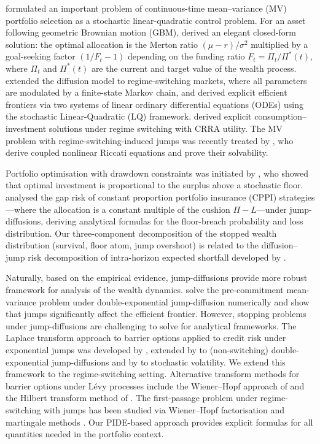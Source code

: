 \documentclass[11pt,a4paper]{article}
\numberwithin{equation}{section}
\begin{document}
\citet{ZhouLi2000} formulated an important problem of continuous-time mean--variance (MV) portfolio selection as a stochastic linear-quadratic control problem. For an asset following geometric Brownian motion (GBM), \citet{Lipton2001} derived an elegant closed-form solution: the optimal allocation is the Merton ratio $(\mu - r)/\sigma^2$ multiplied by a goal-seeking factor $(1/F_t - 1)$ depending on the funding ratio $F_t = \Pi_t / \Pi^*(t)$, where $\Pi_t$ and $\Pi^*(t)$ are the current and target value of the wealth process. \citet{ZhouYin2003} \citep[see also][]{ChenYaoYin2008,Xie2008} extended the diffusion model to regime-switching markets, where all parameters are modulated by a finite-state Markov chain, and derived explicit efficient frontiers via two systems of linear ordinary differential equations (ODEs) using the stochastic Linear-Quadratic (LQ) framework. \citet{SotomayorCadenillas2009} derived explicit consumption--investment solutions under regime switching with CRRA utility. The MV problem with regime-switching-induced jumps was recently treated by \citet{ShiXu2025}, who derive coupled nonlinear Riccati equations and prove their solvability. 


Portfolio optimisation with drawdown constraints was initiated by \citet{GrossmanZhou1993}, who showed that optimal investment is proportional to the surplus above a stochastic floor. \citet{ContTankov2009} analysed the gap risk of constant proportion portfolio insurance (CPPI) strategies---where the allocation is a constant multiple of the cushion $\Pi - L$---under jump-diffusions, deriving analytical formulas for the floor-breach probability and loss distribution. Our three-component decomposition of the stopped wealth distribution (survival, floor atom, jump overshoot) is related to the diffusion--jump risk decomposition of intra-horizon expected shortfall developed by \citet{FarkasVasiljevic2021}.  

 

Naturally, based on the empirical evidence, jump-diffusions provide more robust framework for analysis of the wealth dynamics. \citet{DangForsyth2014} solve the pre-commitment mean-variance problem under \cite{Kou2002} double-exponential jump-diffusion numerically and show that jumps significantly affect the efficient frontier. However, stopping problems under jump-diffusions are challenging to solve for analytical frameworks. The Laplace transform approach to barrier options applied to credit risk under exponential jumps was developed by \citet{Lipton2001assets}, extended by \citet{Sepp2004} to (non-switching) double-exponential jump-diffusions and by \citet{Sepp2006} to stochastic volatility. We extend this framework to the regime-switching setting. Alternative transform methods for barrier options under L\'evy processes include the Wiener--Hopf approach of \citet{BoyarchenkoLevendorskii2012} and the Hilbert transform method of \citet{FengLinetsky2008}. The first-passage problem under regime-switching with jumps has been studied via Wiener--Hopf factorisation \citep{JiangPistorius2008} and martingale methods \citep{SiuEtAl2014}. Our PIDE-based approach provides explicit formulas for all quantities needed in the portfolio context. 
\end{document}
